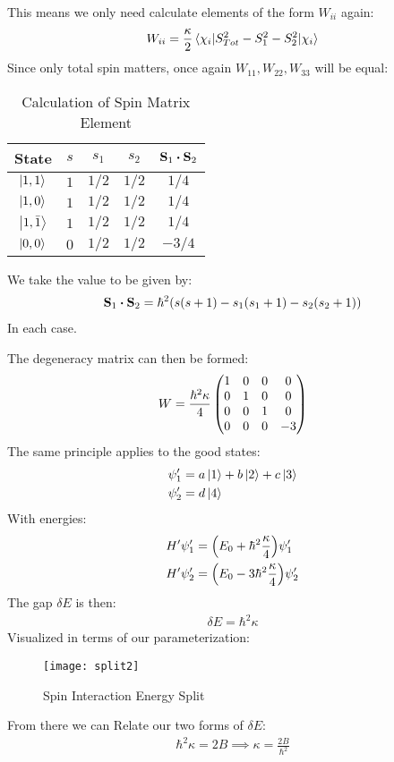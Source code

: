 \documentclass[12pt]{article}
\theoremstyle{plain}
\theoremstyle{definition}
\begin{document}
This means we only need calculate elements of the form $W_{ii}$ again:
\begin{align*}
  W_{ii}=\frac\kappa2\mel{\chi_i}{S_{Tot}^2-S_1^2-S_2^2}{\chi_i}
\end{align*}
Since only total spin matters, once again $W_{11},W_{22},W_{33}$ will be equal:
\begin{table}[H]
  \centering
  \begin{tabular}[H]{c|c|c|c|c}
    State & $s$ & $s_1$ & $s_2$ & $\vb{S}_1\vdot\vb{S}_2$\\\hline
    $\ket{1,1}$       & $1$ & $1/2$ & $1/2$ & $ 1/4$\\\hline
    $\ket{1,0}$       & $1$ & $1/2$ & $1/2$ & $ 1/4$\\\hline
    $\ket{1,\bar{1}}$ & $1$ & $1/2$ & $1/2$ & $ 1/4$\\\hline
    $\ket{0,0}$       & $0$ & $1/2$ & $1/2$ & $-3/4$
  \end{tabular}
  \caption{Calculation of Spin Matrix Element}
\end{table}
We take the value to be given by:
\begin{align*}
  \vb{S}_1\vdot\vb{S}_2=\hbar^2\qty(s(s+1)-s_1(s_1+1)-s_2(s_2+1))
\end{align*}
In each case.

The degeneracy matrix can then be formed:
\begin{align*}
  W=\frac{\hbar^2\kappa}4\pmqty{\dmat[0]{1,1,1,-3}}
\end{align*}
The same principle applies to the good states:
\begin{align*}
  \psi_1'&=a\ket{1}+b\ket{2}+c\ket{3}\\
  \psi_2'&=d\ket{4}
\end{align*}
With energies:
\begin{align*}
  H'\psi_1'&=\qty(E_0+\hbar^2\frac\kappa4)\psi_1'\\
  H'\psi_2'&=\qty(E_0-3\hbar^2\frac\kappa4)\psi_2'
\end{align*}
The gap $\delta E$ is then:
\begin{align*}
  \delta E=\hbar^2\kappa
\end{align*}
Visualized in terms of our parameterization:
\begin{figure}[H]
  \centering
  \texttt{[image: split2]}
  \caption{Spin Interaction Energy Split}
\end{figure}
From there we can Relate our two forms of $\delta E$:
\begin{align*}
  \hbar^2\kappa=2B\implies \kappa=\frac{2B}{\hbar^2}
\end{align*}
\end{document}
